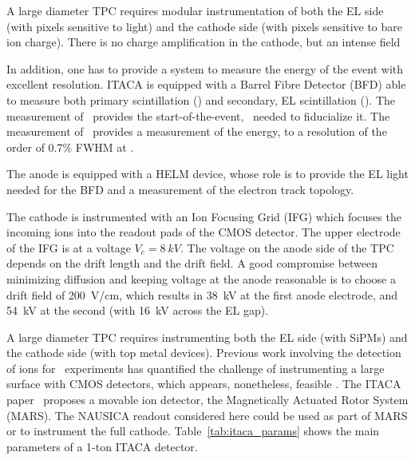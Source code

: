 \documentclass[pdflatex,iicol,sn-mathphys-num]{sn-jnl}
\begin{document}
A large diameter TPC requires modular instrumentation of both the EL side (with pixels sensitive to light) and the cathode side (with pixels sensitive to bare ion charge). There is no charge amplification in the cathode, but an intense field

In addition, one has to provide a system to measure the energy of the event with excellent resolution. ITACA is equipped with a Barrel Fibre Detector (BFD) able to measure both primary scintillation (\sone) and secondary, EL scintillation (\stwo). The measurement of \sone\ provides the start-of-the-event, \tz\, needed to fiducialize it. The measurement of \stwo\ provides a measurement of the energy, to a resolution 
of the order of 0.7\% FWHM at \Qbb. 

The anode is equipped with a HELM device, whose role is to provide the EL light needed for the BFD and a measurement of the electron track topology. 



The cathode is instrumented with an Ion Focusing Grid (IFG) which focuses the incoming ions into the readout pads of the CMOS detector. The upper electrode of the IFG is at a voltage $V_c = \SI{8}{kV}$. The voltage on the anode side of the TPC depends on the drift length and the drift field. A good compromise between minimizing diffusion and keeping voltage at the anode reasonable is to choose a drift field of \SI{200}{V/cm}, which results in \SI{38}{kV} at the first anode electrode, and \SI{54}{kV} at the second (with \SI{16}{kV} across the EL gap). 
 
 
 A large diameter TPC requires instrumenting both the EL side (with SiPMs) and the cathode side (with top metal devices). 
  Previous work involving the detection of
 ions for \bbonu\ experiments \cite{Nygren_2018, mei2020topmetalcmosdirectcharge} has quantified the challenge of instrumenting a large surface with CMOS detectors, which appears, nonetheless, feasible \cite{You2021}. The ITACA paper~\cite{itaca2026} proposes a movable ion detector, the Magnetically Actuated Rotor System (MARS). The NAUSICA readout considered here could be used as part of MARS or to instrument the full cathode.  Table~\ref{tab:itaca_params} shows the main parameters of a 1-ton ITACA detector. 
\end{document}
